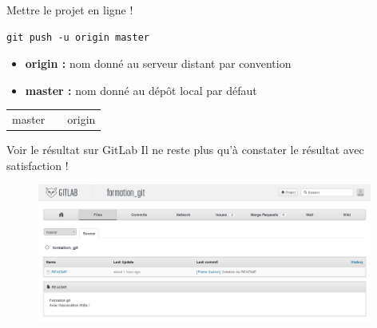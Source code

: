 \documentclass{beamer}
\begin{document}
\begin{frame}[fragile]{Mettre le projet en ligne !}
	\begin{lstlisting}[frame=single]
		git push -u origin master
	\end{lstlisting}
	
	\begin{itemize}
		\item \textbf{origin :} nom donné au serveur distant par convention
		\item \textbf{master :} nom donné au dépôt local par défaut
	\end{itemize}
	
	\begin{figure}
  		\centering
	\end{figure}
	\begin{center}
		\begin{tabular}{p{3.5cm}  p{1cm} p{2cm}}
		\centering master & & origin
		\end{tabular}
	\end{center}
\end{frame}

\begin{frame}{Voir le résultat sur GitLab}
	Il ne reste plus qu'à constater le résultat avec satisfaction !
	\begin{figure}
  		\centering
 		\includegraphics[width=11cm]{img/shot11}
	\end{figure}
\end{frame}
\end{document}
